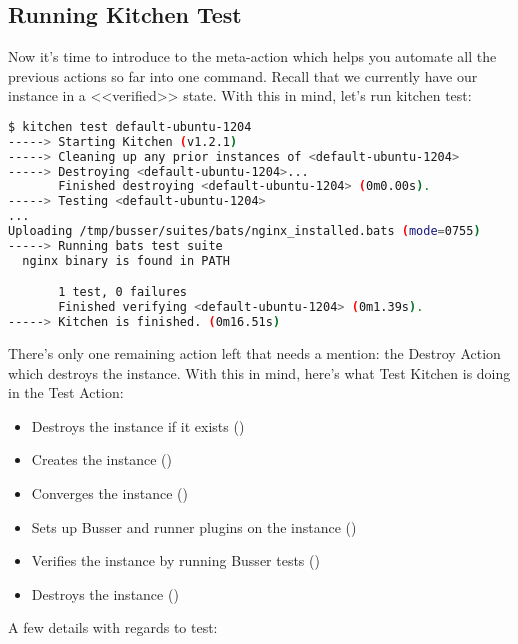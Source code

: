 \subsection{Running Kitchen Test}

Now it's time to introduce to the  meta-action which helps you automate all the previous actions so far into one command. Recall that we currently have our instance in a <<verified>> state. With this in mind, let's run kitchen test:

\begin{lstlisting}[language=Bash,label=lst:testing-test-kitchen18]
$ kitchen test default-ubuntu-1204
-----> Starting Kitchen (v1.2.1)
-----> Cleaning up any prior instances of <default-ubuntu-1204>
-----> Destroying <default-ubuntu-1204>...
       Finished destroying <default-ubuntu-1204> (0m0.00s).
-----> Testing <default-ubuntu-1204>
...
Uploading /tmp/busser/suites/bats/nginx_installed.bats (mode=0755)
-----> Running bats test suite
  nginx binary is found in PATH

       1 test, 0 failures
       Finished verifying <default-ubuntu-1204> (0m1.39s).
-----> Kitchen is finished. (0m16.51s)
\end{lstlisting}

There's only one remaining action left that needs a mention: the Destroy Action which destroys the instance. With this in mind, here's what Test Kitchen is doing in the Test Action:

\begin{itemize}
  \item Destroys the instance if it exists ()
  \item Creates the instance ()
  \item Converges the instance ()
  \item Sets up Busser and runner plugins on the instance ()
  \item Verifies the instance by running Busser tests ()
  \item Destroys the instance ()
\end{itemize}

A few details with regards to test:

